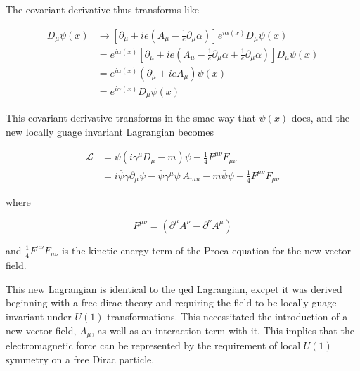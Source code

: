 \noindent The covariant derivative thus transforms like

\begin{equation}\label{eq:u1_covariant_derivative_transformation}
\begin{aligned}
D_{\mu}\psi(x) & \rightarrow [ \partial_{\mu} + ie(A_{\mu} -
\frac{1}{e}\partial_{\mu}\alpha) ]e^{i\alpha(x)}D_{\mu}\psi(x) \\
& = e^{i\alpha(x)}[ \partial_{\mu} + ie(A_{\mu} -
\frac{1}{e}\partial_{\mu}\alpha + \frac{1}{e}\partial_{\mu}\alpha) ]D_{\mu}\psi(x) \\
 & = e^{i\alpha(x)}(\partial_{\mu} + ieA_{\mu})\psi(x) \\
 & = e^{i\alpha(x)}D_{\mu}\psi(x)
\end{aligned}
\end{equation}

\noindent This covariant derivative transforms in the smae way that $\psi(x)$
does, and the new locally guage invariant Lagrangian becomes

\begin{equation}\label{eq:u1_invariant_lagrangian}
\begin{aligned}
\mathcal{L} & = \bar{\psi}(i\gamma^{\mu}D_{\mu} - m)\psi - \frac{1}{4}F^{\mu\nu}F_{\mu\nu} \\
& = i\bar{\psi}\gamma\partial_{\mu}\psi -
\bar{\psi}\gamma^{\mu}\psi~A_{mu} - m\bar{\psi}\psi -
\frac{1}{4}F^{\mu\nu}F_{\mu\nu} 
\end{aligned}
\end{equation}

\noindent where

\begin{equation}\label{eq:u1_field_strength_tensor}
F^{\mu\nu} = (\partial^{\mu}A^{\nu} - \partial^{\nu}A^{\mu})
\end{equation}

\noindent and $\frac{1}{4}F^{\mu\nu}F_{\mu\nu} $ is the kinetic energy
term of the Proca equation for the new vector field.

\par This new Lagrangian is identical to the \acrshort{qed}
Lagrangian, excpet it was derived beginning with a free dirac theory
and requiring the field to be locally guage invariant under $U(1)$
transformations.  This necessitated the introduction of a new vector
field, $A_{\mu}$, as well as an interaction term with it.  This
implies that the electromagnetic force can be represented by the
requirement of local $U(1)$ symmetry on a free Dirac particle.  

